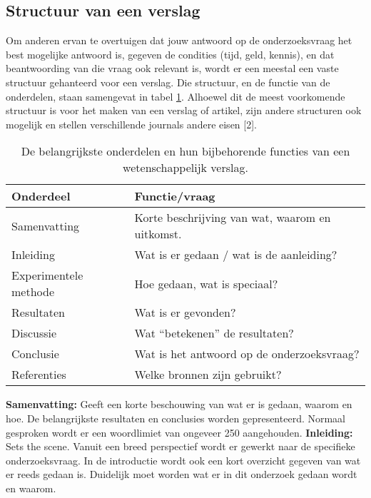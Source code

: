 \subsection{Structuur van een verslag}
Om anderen ervan te overtuigen dat jouw antwoord op de onderzoeksvraag het best mogelijke antwoord is, gegeven de condities (tijd, geld, kennis), en dat beantwoording van die vraag ook relevant is, wordt er een meestal een vaste structuur gehanteerd voor een verslag. Die structuur, en de functie van de onderdelen, staan samengevat in tabel \ref{tab:structuurverslag}. Alhoewel dit de meest voorkomende structuur is voor het maken van een verslag of artikel, zijn andere structuren ook mogelijk en stellen verschillende journals andere eisen [2].
%
\begin{table}[H]
    \centering
    \caption{De belangrijkste onderdelen en hun bijbehorende functies van een wetenschappelijk verslag.}
    \begin{tabular}{l|l}
         \textbf{Onderdeel} & \textbf{Functie/vraag} \\
         \hline
         Samenvatting &	Korte beschrijving van wat, waarom en uitkomst.\\
         Inleiding	& Wat is er gedaan / wat is de aanleiding?\\
         Experimentele methode &	Hoe gedaan, wat is speciaal?\\
         Resultaten	& Wat is er gevonden?\\
         Discussie & Wat “betekenen” de resultaten?\\
         Conclusie & Wat is het antwoord op de onderzoeksvraag?\\
         Referenties & Welke bronnen zijn gebruikt?\\
    \end{tabular}
    \label{tab:structuurverslag}
\end{table}
%
\textbf{Samenvatting:} Geeft een korte beschouwing van wat er is gedaan, waarom en hoe. De belangrijkste resultaten en conclusies worden gepresenteerd. Normaal gesproken wordt er een woordlimiet van ongeveer 250 aangehouden.\newline\newline
%
\textbf{Inleiding:} Sets the scene. Vanuit een breed perspectief wordt er gewerkt naar de specifieke onderzoeksvraag. In de introductie wordt ook een kort overzicht gegeven van wat er reeds gedaan is. Duidelijk moet worden wat er in dit onderzoek gedaan wordt en waarom.\newline\newline
